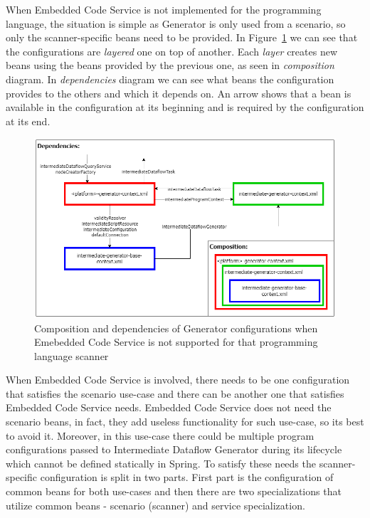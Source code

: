 \par
When Embedded Code Service is not implemented for the programming language, the situation is simple as Generator is only used from a scenario, so only the scanner-specific beans need to be provided. In Figure~\ref{fig:generatorNoECS} we can see that the configurations are \textit{layered} one on top of another. Each \textit{layer} creates new beans using the beans provided by the previous one, as seen in \textit{composition} diagram. In \textit{dependencies} diagram we can see what beans the configuration provides to the others and which it depends on. An arrow shows that a bean is available in the configuration at its beginning and is required by the configuration at its end.
\begin{figure}[ht]\centering
\includegraphics[width=1.0\textwidth]{img/generator_no_ECS.png}
\caption{Composition and dependencies of Generator configurations when Emebedded Code Service is not supported for that programming language scanner}
\label{fig:generatorNoECS}
\end{figure} 
\par
When Embedded Code Service is involved, there needs to be one configuration that satisfies the scenario use-case and there can be another one that satisfies Embedded Code Service needs. Embedded Code Service does not need the scenario beans, in fact, they add useless functionality for such use-case, so its best to avoid it. Moreover, in this use-case there could be multiple program configurations passed to Intermediate Dataflow Generator during its lifecycle which cannot be defined statically in Spring. To satisfy these needs the scanner-specific configuration is split in two parts. First part is the configuration of common beans for both use-cases and then there are two specializations that utilize common beans - scenario (scanner) and service specialization.
